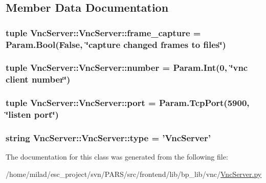 \subsection{Member Data Documentation}
\hypertarget{classVncServer_1_1VncServer_ae12ce7ac563c8d2605be5bb314695293}{
\subsubsection[{frame\_\-capture}]{\setlength{\rightskip}{0pt plus 5cm}tuple {\bf VncServer::VncServer::frame\_\-capture} = Param.Bool(False, \char`\"{}capture changed frames to files\char`\"{})}}
\label{classVncServer_1_1VncServer_ae12ce7ac563c8d2605be5bb314695293}
\hypertarget{classVncServer_1_1VncServer_a04d2358b5b6b9071d763987c65ffc42a}{
\subsubsection[{number}]{\setlength{\rightskip}{0pt plus 5cm}tuple {\bf VncServer::VncServer::number} = Param.Int(0, \char`\"{}vnc client {\bf number}\char`\"{})}}
\label{classVncServer_1_1VncServer_a04d2358b5b6b9071d763987c65ffc42a}
\hypertarget{classVncServer_1_1VncServer_acd53d0ea3e4e1a0f99372c165be452c5}{
\subsubsection[{port}]{\setlength{\rightskip}{0pt plus 5cm}tuple {\bf VncServer::VncServer::port} = Param.TcpPort(5900, \char`\"{}listen {\bf port}\char`\"{})}}
\label{classVncServer_1_1VncServer_acd53d0ea3e4e1a0f99372c165be452c5}
\hypertarget{classVncServer_1_1VncServer_a18b1167e6c0414f5bbe76116e29e81c8}{
\subsubsection[{type}]{\setlength{\rightskip}{0pt plus 5cm}string {\bf VncServer::VncServer::type} = '{\bf VncServer}'}}
\label{classVncServer_1_1VncServer_a18b1167e6c0414f5bbe76116e29e81c8}


The documentation for this class was generated from the following file:\begin{DoxyCompactItemize}
\item 
/home/milad/esc\_\-project/svn/PARS/src/frontend/lib/bp\_\-lib/vnc/\hyperlink{VncServer_8py}{VncServer.py}\end{DoxyCompactItemize}
